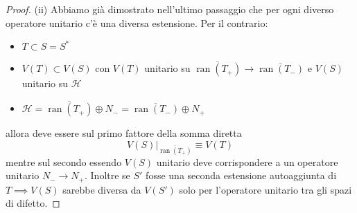\documentclass[a4paper,10pt]{article}
\theoremstyle{definition}
\DeclareMathOperator*{\ran}{ran}
\newcommand{\hil}{\mathcal{H}} %
\theoremstyle{indentdefinition}
\theoremstyle{indenttheorem}
\theoremstyle{myremark}
\theoremstyle{indentgeneral}
\begin{document}
\begin{proof} (ii) Abbiamo già dimostrato nell'ultimo passaggio che per ogni diverso operatore unitario c'è una diversa estensione. Per il contrario: 
\begin{itemize}
    \item $T\subset S=S^*$
    \item $V(T)\subset V(S)$ con $V(T)$ unitario su $\overline{\ran(T_+)}\to\overline{\ran(T_-)}$ e $V(S)$ unitario su $\hil$
    \item $\hil=\overline{\ran(T_+)}\oplus N_-=\overline{\ran(T_-)}\oplus N_+$
\end{itemize}
allora deve essere sul primo fattore della somma diretta
$$V(S)|_{\overline{\ran(T_+)}}\equiv V(T)$$
mentre  sul secondo essendo $V(S)$ unitario deve corrispondere a un operatore unitario $N_-\to N_+$. Inoltre se $S'$ fosse una seconda estensione autoaggiunta di $T\implies
 V(S)$ sarebbe diversa da $V(S')$ solo per l'operatore unitario tra gli spazi di  difetto.
\end{proof}
\end{document}
